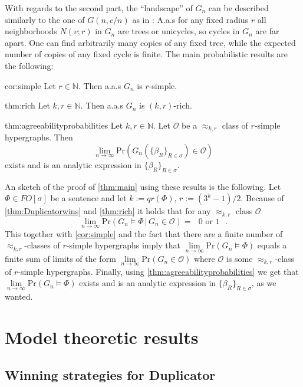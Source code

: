 \documentclass[12pt,notitlepage,a4paper]{article}
\theoremstyle{definition}
\newcommand{\N}{\mathbb{N}}
\newcommand{\Ln}{\lim\limits_{n\to \infty}}
\newcommand{\PR}[1]{\mathrm{Pr}\left(#1\right)}
\begin{document}
With regards to the second part, 
the ``landscape'' of $G_n$ can be described similarly to the one 
of $G(n,c/n)$ as in \cite{shelah1994can}: A.a.s for any fixed radius $r$
all neighborhoods $N(v;r)$ in $G_n$ are trees or unicycles, so cycles in 
$G_n$ are far apart. One can find arbitrarily
many copies of any fixed tree, while the expected number of copies 
of any fixed cycle is finite. The main probabilistic results are the
following:
\begin{reptheorem}{cor:simple}
  	Let $r\in \N$. Then a.a.s $G_n$ is $r$-simple.
\end{reptheorem}

\begin{reptheorem}{thm:rich}
	Let $k,r\in \N$. Then a.a.s $G_n$ is $(k,r)$-rich.
\end{reptheorem}


\begin{reptheorem}{thm:agreeabilityprobabilities}
	Let $k,r \in \N$. Let $\mathcal{O}$ be a $\approx_{k,r}$ class
	of $r$-simple hypergraphs. Then 
	\[
	\Ln \mathrm{Pr}\left(G_n\left(\{\beta_R\}_{R\in \sigma}\right)\in \mathcal{O}\right)
	\]
	exists
	and is an analytic expression in $\{\beta_R\}_{R\in \sigma}$.
\end{reptheorem}

An sketch of the proof of \cref{thm:main} using these results is the following.
Let $\Phi\in FO[\sigma]$ be a sentence and let $k:=qr(\Phi)$, $r:=(3^k-1)/2$.
Because of \cref{thm:Duplicatorwins} and \cref{thm:rich}
it holds that for any $\approx_{k,r}$ class $\mathcal{O}$
\[
\Ln \mathrm{Pr}\left(G_n \models \Phi\, \big| \, G_n\in \mathcal{O} \right)= \text{ $0$ or $1$ }.
\]
This together with \cref{cor:simple}
and the fact that there are a finite number of
$\approx_{k,r}$-classes of $r$-simple hypergraphs imply that $\Ln \PR{G_n \models \Phi}$
equals a finite sum of limits of the form $\Ln \PR{G_n \in \mathcal{O}}$
where $\mathcal{O}$ is some $\approx_{k,r}$-class of $r$-simple hypergraphs.
Finally, using \cref{thm:agreeabilityprobabilities}
 we get that $\Ln \PR{G_n \models \Phi}$ exists and 
is an analytic expression in $\{\beta_R\}_{R\in \sigma}$, as we wanted. 


\section{Model theoretic results}

\subsection{Winning strategies for Duplicator}
\end{document}
